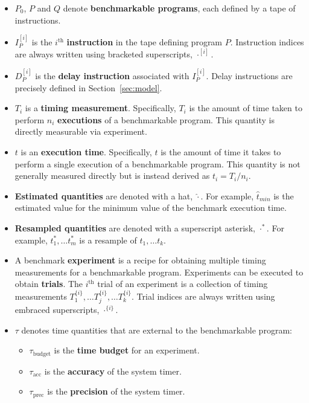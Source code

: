 \documentclass[conference]{IEEEtran}
\begin{document}
\begin{itemize}
    \item
    $P_0$, $P$ and $Q$ denote \textbf{benchmarkable programs}, each defined by a tape of
    instructions.

    \item
    $I^{[i]}_{P}$ is the $i^{\textrm{th}}$ \textbf{instruction} in the tape defining program $P$.
    Instruction indices are always written using bracketed superscripts, $\cdot^{[i]}$.

    \item
    $D^{[i]}_{P}$ is the \textbf{delay instruction} associated with $I^{[i]}_{P}$. Delay
    instructions are precisely defined in Section~\ref{sec:model}.

    \item
    $T_i$ is a \textbf{timing measurement}. Specifically, $T_i$ is the amount of time taken
    to perform $n_i$ \textbf{executions} of a benchmarkable program. This quantity is
    directly measurable via experiment.

    \item
    $t$ is an \textbf{execution time}. Specifically, $t$ is the amount of time it takes to
    perform a single execution of a benchmarkable program. This quantity is not generally
    measured directly but is instead derived as $t_i = T_i / n_i$.

    \item
    \textbf{Estimated quantities} are denoted with a hat, $\hat\cdot$. For example,
    $\hat{t}_{min}$ is the estimated value for the minimum value of the benchmark execution
    time.

    \item
    \textbf{Resampled quantities} are denoted with a superscript asterisk, $\cdot^*$. For
    example, $t^*_1, \dots t^*_m$ is a resample of $t_1, \dots t_k$.

    \item
    A benchmark \textbf{experiment} is a recipe for obtaining multiple timing measurements
    for a benchmarkable program. Experiments can be executed to obtain \textbf{trials}. The
    $i^{\textrm{th}}$ trial of an experiment is a collection of timing measurements
    $T^{\{i\}}_1, \dots T^{\{i\}}_j, \dots T^{\{i\}}_k$. Trial indices are always
    written using embraced superscripts, $\cdot^{\{i\}}$.

    \item
    $\tau$ denotes time quantities that are external to the benchmarkable program:
    \begin{itemize}
        \item $\tau_{\textrm{budget}}$ is the \textbf{time budget} for an experiment.
        \item $\tau_{\textrm{acc}}$ is the \textbf{accuracy} of the system timer.
        \item $\tau_{\textrm{prec}}$ is the \textbf{precision} of the system timer.
    \end{itemize}


\end{itemize}
\end{document}
